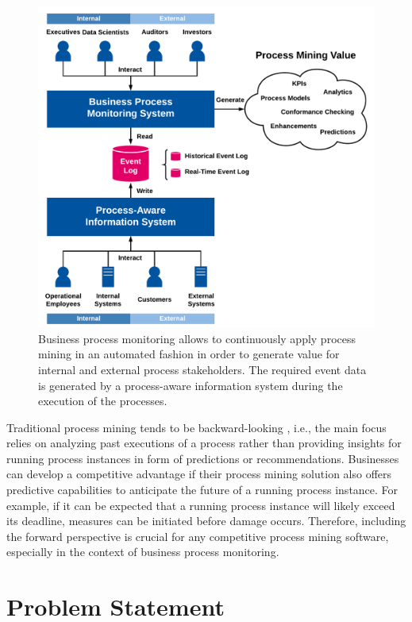 \begin{figure}[tbp!]
	\centering
	\includegraphics[width=\textwidth]{figures/process-monitoring}
	\caption[Process mining in the context of business process monitoring]{Business process monitoring allows to continuously apply process mining in an automated fashion in order to generate value for internal and external process stakeholders. The required event data is generated by a process-aware information system during the execution of the processes.}
	\label{fig:process-monitoring}
\end{figure}

Traditional process mining tends to be backward-looking \cite{DBLP:conf/scsc/Aalst18}, i.e., the main focus relies on analyzing past executions of a process rather than providing insights for running process instances in form of predictions or recommendations.
Businesses can develop a competitive advantage if their process mining solution also offers predictive capabilities to anticipate the future of a running process instance.
For example, if it can be expected that a running process instance will likely exceed its deadline, measures can be initiated before damage occurs.
Therefore, including the forward perspective is crucial for any competitive process mining software, especially in the context of business process monitoring.

\section{Problem Statement}

